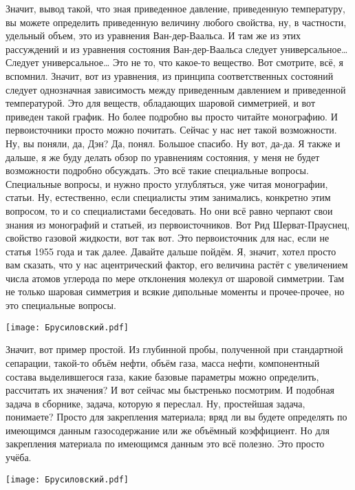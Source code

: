 \documentclass[main.tex]{subfiles}
\begin{document}
Значит, вывод такой, что зная приведенное давление, приведенную температуру, вы можете определить приведенную величину любого свойства, ну, в частности, удельный объем, это из уравнения Ван-дер-Ваальса.
И там же из этих рассуждений и из уравнения состояния Ван-дер-Ваальса следует универсальное…
Следует универсальное…
Это не то, что какое-то вещество.
Вот смотрите, всё, я вспомнил.
Значит, вот из уравнения, из принципа соответственных состояний следует однозначная зависимость между приведенным давлением и приведенной температурой.
Это для веществ, обладающих шаровой симметрией, и вот приведен такой график.
Но более подробно вы просто читайте монографию.
И первоисточники просто можно почитать.
Сейчас у нас нет такой возможности.
Ну, вы поняли, да, Дэн?
Да, понял.
Большое спасибо.
Ну вот, да-да.
Я также и дальше, я же буду делать обзор по уравнениям состояния, у меня не будет возможности подробно обсуждать.
Это всё такие специальные вопросы.
Специальные вопросы, и нужно просто углубляться, уже читая монографии, статьи.
Ну, естественно, если специалисты этим занимались, конкретно этим вопросом, то и со специалистами беседовать.
Но они всё равно черпают свои знания из монографий и статьей, из первоисточников.
Вот Рид Шерват-Прауснец, свойство газовой жидкости, вот так вот.
Это первоисточник для нас, если не статья 1955 года и так далее.
Давайте дальше пойдём.
Я, значит, хотел просто вам сказать, что у нас ацентрический фактор, его величина растёт с увеличением числа атомов углерода по мере отклонения молекул от шаровой симметрии.
Там не только шаровая симметрия и всякие дипольные моменты и прочее-прочее, но это специальные вопросы.

\begin{center}
\texttt{[image: Брусиловский.pdf]}
\end{center}

Значит, вот пример простой.
Из глубинной пробы, полученной при стандартной сепарации, такой-то объём нефти, объём газа, масса нефти, компонентный состава выделившегося газа, какие базовые параметры можно определить, рассчитать их значения?
И вот сейчас мы быстренько посмотрим.
И подобная задача в сборнике, задача, которую я переслал.
Ну, простейшая задача, понимаете?
Просто для закрепления материала; вряд ли вы будете определять по имеющимся данным газосодержание или же объёмный коэффициент.
Но для закрепления материала по имеющимся данным это всё полезно.
Это просто учёба.

\begin{center}
\texttt{[image: Брусиловский.pdf]}
\end{center}
\end{document}
